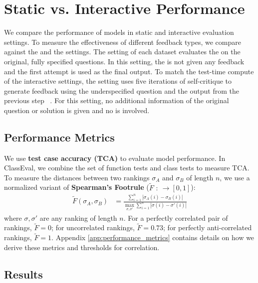 % 

\section{Static vs. Interactive Performance}
\label{sec:static_vs_interactive_perf}





We compare the performance of models in static and interactive evaluation settings.
To measure the effectiveness of different feedback types, we compare against the \vanilla{} and the \baseline{} settings.
The \vanilla{} setting of each dataset evaluates the \cm{} on the original, fully specified questions.
In this setting, the \cm{} is not given any feedback and the first attempt is used as the final output.
To match the test-time compute of the interactive settings, the \baseline{} setting uses five iterations of self-critique to generate feedback using the underspecified question and the output from the previous step ~\citep{madaan2023selfrefineiterativerefinementselffeedback}.
For this setting, no additional information of the original question or solution is given and no \user{} is involved.


\subsection{Performance Metrics}
We use \textbf{test case accuracy (TCA)} to evaluate model performance. In ClassEval, we combine the set of function tests and class tests to measure TCA. To measure the distances between two rankings $\sigma_A$ and $\sigma_B$ of length $n$, we use a normalized variant of \textbf{Spearman's Footrule } ($\tilde{F}$ $:\ \to [0, 1]$):
%
\begin{align*}
    \tilde{F}(\sigma_A, \sigma_B) &= \frac{ \sum^n_{i=1} |\sigma_A(i) - \sigma_B(i)|}{\max_{\sigma, \sigma'}  \sum^n_{i=1} |\sigma(i) - \sigma'(i)|}
\end{align*}
where $\sigma, \sigma'$ are any ranking of length $n$.
For a perfectly correlated pair of rankings, $\tilde{F}=0$; for uncorrelated rankings, $\tilde{F}=0.73$; for perfectly anti-correlated rankings, $\tilde{F}=1$.
Appendix \ref{app:performance_metrics} contains details on how we derive these metrics and thresholds for correlation.


\subsection{Results}



